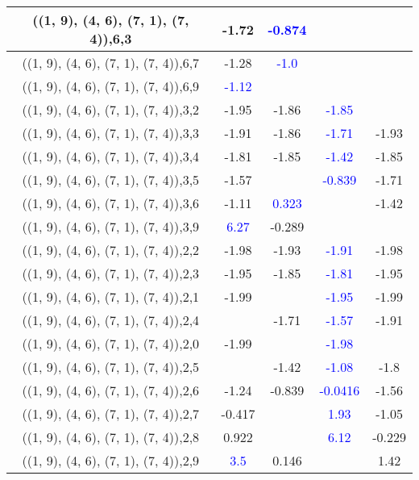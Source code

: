 \documentclass{article}
\begin{document}
\begin{center}
\begin{longtable}{|c|c|c|c|c|}
        	\hline
        	((1, 9), (4, 6), (7, 1), (7, 4)),6,3&-1.72& \textcolor{blue}{-0.874}&&\\
        	\hline
        	((1, 9), (4, 6), (7, 1), (7, 4)),6,7&-1.28& \textcolor{blue}{-1.0}&&\\
        	\hline
        	((1, 9), (4, 6), (7, 1), (7, 4)),6,9& \textcolor{blue}{-1.12}&&&\\
        	\hline
        	((1, 9), (4, 6), (7, 1), (7, 4)),3,2&-1.95&-1.86& \textcolor{blue}{-1.85}&\\
        	\hline
        	((1, 9), (4, 6), (7, 1), (7, 4)),3,3&-1.91&-1.86& \textcolor{blue}{-1.71}&-1.93\\
        	\hline
        	((1, 9), (4, 6), (7, 1), (7, 4)),3,4&-1.81&-1.85& \textcolor{blue}{-1.42}&-1.85\\
        	\hline
        	((1, 9), (4, 6), (7, 1), (7, 4)),3,5&-1.57&& \textcolor{blue}{-0.839}&-1.71\\
        	\hline
        	((1, 9), (4, 6), (7, 1), (7, 4)),3,6&-1.11& \textcolor{blue}{0.323}&&-1.42\\
        	\hline
        	((1, 9), (4, 6), (7, 1), (7, 4)),3,9& \textcolor{blue}{6.27}&-0.289&&\\
        	\hline
        	((1, 9), (4, 6), (7, 1), (7, 4)),2,2&-1.98&-1.93& \textcolor{blue}{-1.91}&-1.98\\
        	\hline
        	((1, 9), (4, 6), (7, 1), (7, 4)),2,3&-1.95&-1.85& \textcolor{blue}{-1.81}&-1.95\\
        	\hline
        	((1, 9), (4, 6), (7, 1), (7, 4)),2,1&-1.99&& \textcolor{blue}{-1.95}&-1.99\\
        	\hline
        	((1, 9), (4, 6), (7, 1), (7, 4)),2,4&&-1.71& \textcolor{blue}{-1.57}&-1.91\\
        	\hline
        	((1, 9), (4, 6), (7, 1), (7, 4)),2,0&-1.99&& \textcolor{blue}{-1.98}&\\
        	\hline
        	((1, 9), (4, 6), (7, 1), (7, 4)),2,5&&-1.42& \textcolor{blue}{-1.08}&-1.8\\
        	\hline
        	((1, 9), (4, 6), (7, 1), (7, 4)),2,6&-1.24&-0.839& \textcolor{blue}{-0.0416}&-1.56\\
        	\hline
        	((1, 9), (4, 6), (7, 1), (7, 4)),2,7&-0.417&& \textcolor{blue}{1.93}&-1.05\\
        	\hline
        	((1, 9), (4, 6), (7, 1), (7, 4)),2,8&0.922&& \textcolor{blue}{6.12}&-0.229\\
        	\hline
        	((1, 9), (4, 6), (7, 1), (7, 4)),2,9& \textcolor{blue}{3.5}&0.146&&1.42\\

\end{longtable}
\end{center}
\end{document}

